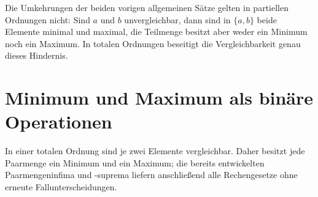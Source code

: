\documentclass[main.tex]{subfiles}
\begin{document}
Die Umkehrungen der beiden vorigen allgemeinen Sätze gelten in partiellen
Ordnungen nicht: Sind \(a\) und \(b\) unvergleichbar, dann sind in
\(\{a,b\}\) beide Elemente minimal und maximal, die Teilmenge besitzt aber
weder ein Minimum noch ein Maximum. In totalen Ordnungen beseitigt die
Vergleichbarkeit genau dieses Hindernis.

\section{Minimum und Maximum als binäre Operationen}

\let\TotalOrderProofStepWideStarBreak\proofstepwidestarbreak
\let\proofstepwidestarbreak\proofstepwidestarbreakkeep

In einer totalen Ordnung sind je zwei Elemente vergleichbar. Daher besitzt
jede Paarmenge ein Minimum und ein Maximum; die bereits entwickelten
Paarmengeninfima und -suprema liefern anschließend alle Rechengesetze ohne
erneute Fallunterscheidungen.
\end{document}
